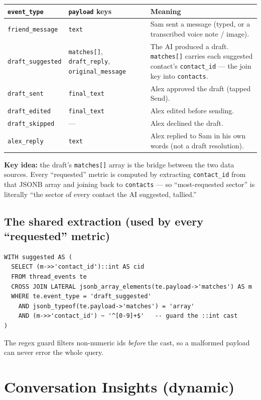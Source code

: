 \documentclass[11pt, a4paper]{article}
\begin{document}
\begin{longtable}{@{}p{3.4cm}p{4.2cm}p{7.4cm}@{}}
\toprule
\texttt{event\_type} & \texttt{payload} keys & Meaning \\
\midrule
\endhead
\texttt{friend\_message} & \texttt{text} & Sam sent a message (typed, or a transcribed voice note / image). \\
\texttt{draft\_suggested} & \texttt{matches[]}, \texttt{draft\_reply}, \texttt{original\_message} & The AI produced a draft. \texttt{matches[]} carries each suggested contact's \texttt{contact\_id} --- the join key into \texttt{contacts}. \\
\texttt{draft\_sent} & \texttt{final\_text} & Alex approved the draft (tapped Send). \\
\texttt{draft\_edited} & \texttt{final\_text} & Alex edited before sending. \\
\texttt{draft\_skipped} & --- & Alex declined the draft. \\
\texttt{alex\_reply} & \texttt{text} & Alex replied to Sam in his own words (not a draft resolution). \\
\bottomrule
\end{longtable}

\textbf{Key idea:} the draft's \texttt{matches[]} array is the bridge between the two data sources. Every ``requested'' metric is computed by extracting \texttt{contact\_id} from that JSONB array and joining back to \texttt{contacts} --- so ``most-requested sector'' is literally ``the sector of every contact the AI suggested, tallied.''

\subsection{The shared extraction (used by every ``requested'' metric)}
\begin{lstlisting}[style=sql]
WITH suggested AS (
  SELECT (m->>'contact_id')::int AS cid
  FROM thread_events te
  CROSS JOIN LATERAL jsonb_array_elements(te.payload->'matches') AS m
  WHERE te.event_type = 'draft_suggested'
    AND jsonb_typeof(te.payload->'matches') = 'array'
    AND (m->>'contact_id') ~ '^[0-9]+$'   -- guard the ::int cast
)
\end{lstlisting}
The regex guard filters non-numeric ids \emph{before} the cast, so a malformed payload can never error the whole query.

\section{Conversation Insights (dynamic)}
\end{document}
